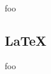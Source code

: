 \begin{singlespacing}
\vspace{-0.5\baselineskip}
\begin{multicols}{2}

\vfill
\columnbreak
\setlength\fboxsep{0pt}
\setlength\fboxrule{0.5pt}
\noindent{}
\end{multicols}
\end{singlespacing}

foo

\subsection{LaTeX}

foo

